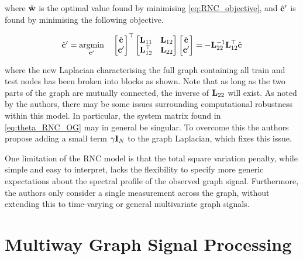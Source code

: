 where $\hat{\mathbf{w}}$ is the optimal value found by minimising \cref{eq:RNC_objective}, and $\hat{\mathbf{c}}'$ is found by minimising the following objective. 

\begin{equation}
    \hat{\mathbf{c}}' = \underset{\mathbf{c}'}{\text{argmin}} \quad \begin{bmatrix}
        \hat{\mathbf{c}} \\ \mathbf{c}' 
    \end{bmatrix}^\top \begin{bmatrix}
        \mathbf{L}_{11} & \mathbf{L}_{12} \\ \mathbf{L}_{12}^\top & \mathbf{L}_{22}
    \end{bmatrix} \begin{bmatrix}
        \hat{\mathbf{c}} \\ \mathbf{c}' 
    \end{bmatrix} = - \mathbf{L}_{22}^{-1} \mathbf{L}_{12}^\top \hat{\mathbf{c}}
\end{equation}

where the new Laplacian characterising the full graph containing all train and test nodes has been broken into blocks as shown. Note that as long as the two parts of the graph are mutually connected, the inverse of $\mathbf{L}_{22}$ will exist. As noted by the authors, there may be some issues surrounding computational robustness within this model. In particular, the system matrix found in \cref{eq:theta_RNC_OG} may in general be singular. To overcome this the authors propose adding a small term $\gamma \mathbf{I}_N$ to the graph Laplacian, which fixes this issue. 

One limitation of the RNC model is that the total square variation penalty, while simple and easy to interpret, lacks the flexibility to specify more generic expectations about the spectral profile of the observed graph signal. Furthermore, the authors only consider a single measurement across the graph, without extending this to time-varying or general multivariate graph signals. 


\section{Multiway Graph Signal Processing}

